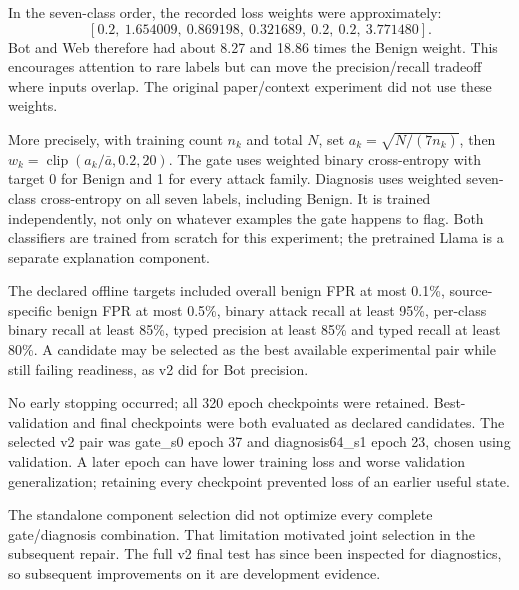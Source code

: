 \documentclass[11pt,a4paper,oneside]{report}
\begin{document}
In the seven-class order, the recorded loss weights were approximately:
\[ [0.2,\ 1.654009,\ 0.869198,\ 0.321689,\ 0.2,\ 0.2,\ 3.771480]. \]
Bot and Web therefore had about 8.27 and 18.86 times the Benign weight. This encourages attention to rare labels but can move the precision/recall tradeoff where inputs overlap. The original paper/context experiment did not use these weights.

More precisely, with training count $n_k$ and total $N$, set $a_k=\sqrt{N/(7n_k)}$, then $w_k=\operatorname{clip}(a_k/\bar a,0.2,20)$. The gate uses weighted binary cross-entropy with target 0 for Benign and 1 for every attack family. Diagnosis uses weighted seven-class cross-entropy on all seven labels, including Benign. It is trained independently, not only on whatever examples the gate happens to flag. Both classifiers are trained from scratch for this experiment; the pretrained Llama is a separate explanation component.

The declared offline targets included overall benign FPR at most 0.1\%, source-specific benign FPR at most 0.5\%, binary attack recall at least 95\%, per-class binary recall at least 85\%, typed precision at least 85\% and typed recall at least 80\%. A candidate may be selected as the best available experimental pair while still failing readiness, as v2 did for Bot precision.

No early stopping occurred; all 320 epoch checkpoints were retained. Best-validation and final checkpoints were both evaluated as declared candidates. The selected v2 pair was gate\_s0 epoch 37 and diagnosis64\_s1 epoch 23, chosen using validation. A later epoch can have lower training loss and worse validation generalization; retaining every checkpoint prevented loss of an earlier useful state.

The standalone component selection did not optimize every complete gate/diagnosis combination. That limitation motivated joint selection in the subsequent repair. The full v2 final test has since been inspected for diagnostics, so subsequent improvements on it are development evidence.
\end{document}
